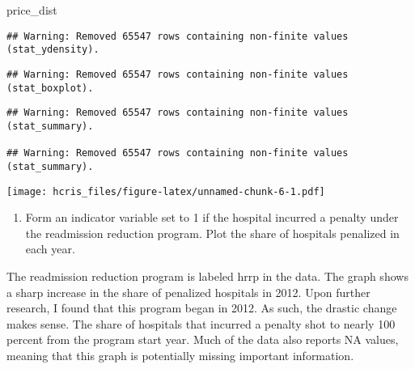 \documentclass[
]{article}
\newenvironment{Shaded}{\begin{snugshade}}{\end{snugshade}}
\newcommand{\NormalTok}[1]{#1}
\providecommand{\tightlist}{%
  \setlength{\itemsep}{0pt}\setlength{\parskip}{0pt}}
\begin{document}
\begin{Shaded}
\begin{Highlighting}[]
\NormalTok{ price\_dist}
\end{Highlighting}
\end{Shaded}

\begin{verbatim}
## Warning: Removed 65547 rows containing non-finite values (stat_ydensity).
\end{verbatim}

\begin{verbatim}
## Warning: Removed 65547 rows containing non-finite values (stat_boxplot).
\end{verbatim}

\begin{verbatim}
## Warning: Removed 65547 rows containing non-finite values (stat_summary).

## Warning: Removed 65547 rows containing non-finite values (stat_summary).
\end{verbatim}

\texttt{[image: hcris\_files/figure-latex/unnamed-chunk-6-1.pdf]}

\begin{enumerate}
\def\labelenumi{\arabic{enumi}.}
\setcounter{enumi}{5}
\tightlist
\item
  Form an indicator variable set to 1 if the hospital incurred a penalty
  under the readmission reduction program. Plot the share of hospitals
  penalized in each year.
\end{enumerate}

The readmission reduction program is labeled hrrp in the data. The graph
shows a sharp increase in the share of penalized hospitals in 2012. Upon
further research, I found that this program began in 2012. As such, the
drastic change makes sense. The share of hospitals that incurred a
penalty shot to nearly 100 percent from the program start year. Much of
the data also reports NA values, meaning that this graph is potentially
missing important information.
\end{document}
